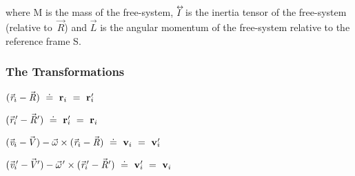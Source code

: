 \documentclass[10pt]{article}
\begin{document}
\par \bigskip \noindent where ${\mathrm{M}}$ is the mass of the free-system, ${\mathit{I}}{\vphantom{\sum_1^2}}^{\hspace{-0.555em}\leftrightarrow}\hspace{-0.300em}$ is the inertia tensor of the free-system (relative \hbox {to ${\vec{\mathit{R}}}$)} and ${\vec{\mathit{L}}}$ is the angular momentum of the free-system relative to the reference frame S.

\vspace{+1.50em}

\par {\centering\subsubsection*{The Transformations}}

\par \bigskip\medskip \hspace{-1.80em} $({\vec{\mathit{r}}}_i - {\vec{\mathit{R}}}) ~\doteq~ {\mathbf{r}}_i ~=~ {\mathbf{r}}_i\hspace{-0.300em}'$

\par \bigskip \hspace{-1.80em} $({\vec{\mathit{r}}}_i\hspace{-0.150em}' - {\vec{\mathit{R}}}\hspace{+0.015em}') ~\doteq~ {\mathbf{r}}_i\hspace{-0.300em}' ~=~ {\mathbf{r}}_i$

\par \bigskip \hspace{-1.80em} $({\vec{\mathit{v}}}_i - \hspace{-0.120em}{\vec{\mathit{V}}}) - {\vec{\omega}} \times ({\vec{\mathit{r}}}_i - {\vec{\mathit{R}}}) ~\doteq~ {\mathbf{v}}_i ~=~ {\mathbf{v}}_i\hspace{-0.300em}'$

\par \bigskip \hspace{-1.80em} $({\vec{\mathit{v}}}_i\hspace{-0.150em}' - \hspace{-0.120em}{\vec{\mathit{V}}}\hspace{-0.045em}') - {\vec{\omega}}\hspace{+0.060em}' \times ({\vec{\mathit{r}}}_i\hspace{-0.150em}' - {\vec{\mathit{R}}}\hspace{+0.015em}') ~\doteq~ {\mathbf{v}}_i\hspace{-0.300em}' ~=~ {\mathbf{v}}_i$
\end{document}
